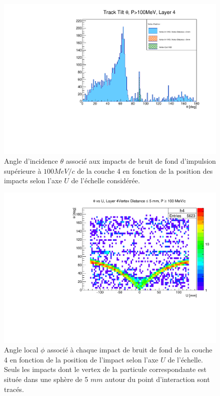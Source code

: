 \begin{appendices}
  \begin{figure}[!htb]
    \centering
    \includegraphics[scale=0.58]{./figures/Track_Tilts_Beamstrahlung/beamstrahlung_Theta/Track_Tilts_Theta_P_sup_100MeV_Layer4.pdf}
    \caption{Angle d'incidence $\theta$ associ\'e aux impacts de bruit de fond d'impulsion sup\'erieure \`a $100 MeV/c$ de la couche 4 en fonction de la position des impacts selon l'axe $U$ de l'\'echelle consid\'er\'ee.}
    \label{fig:theta_Layer4_pT_sup_100MeV}
  \end{figure}  

  \begin{figure}[!htb]
    \centering
    \includegraphics[scale=0.58]{./figures/Track_Tilts_Beamstrahlung/beamstrahlung_Theta/Track_Tilts_Theta_vs_U_P_sup_100MeV_vertex_inf_5mm_Layer4.pdf}
    \caption{Angle local $\phi$ associ\'e \`a chaque impact de bruit de fond de la couche 4 en fonction de la position de l'impact selon l'axe $U$ de l'\'echelle. Seuls les impacts dont le vertex de la particule correspondante est situ\'ee dans une sph\`ere de 5 $mm$ autour du point d'interaction sont trac\'es.}
    \label{fig:theta_Layer4_vs_U_P_sup_100MeV_vertex_inf_5mm}
  \end{figure}
  

\end{appendices}

